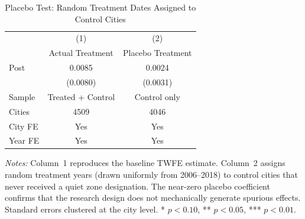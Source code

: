 \begin{table}[t]
\centering
\caption{Placebo Test: Random Treatment Dates Assigned to Control Cities}
\label{tab:placebo}
\begin{tabular}{lcc}
\hline\hline
 & (1) & (2) \\
 & Actual Treatment & Placebo Treatment \\
\hline
Post & 0.0085 & 0.0024 \\
 & (0.0080) & (0.0031) \\
\hline
Sample & Treated + Control & Control only \\
Cities & 4509 & 4046 \\
City FE & Yes & Yes \\
Year FE & Yes & Yes \\
\hline\hline
\end{tabular}
\par\vspace{0.3em}
{\footnotesize
\textit{Notes:} Column~1 reproduces the baseline TWFE estimate. Column~2 assigns random treatment years (drawn uniformly from 2006--2018) to control cities that never received a quiet zone designation. The near-zero placebo coefficient confirms that the research design does not mechanically generate spurious effects. Standard errors clustered at the city level. * $p<0.10$, ** $p<0.05$, *** $p<0.01$.
}
\end{table}

